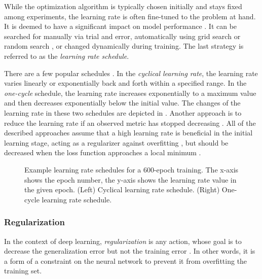While the optimization algorithm is typically chosen initially and stays fixed among experiments, the learning rate is often fine-tuned to the problem at hand. It is deemed to have a significant impact on model performance \cite{Goodfellow-et-al-2016,Bengio2012}. It can be searched for manually via trial and error, automatically using grid search or random search \cite{Goodfellow-et-al-2016}, or changed dynamically during training. The last strategy is referred to as the \emph{learning rate schedule}.

There are a few popular schedules \cite{Smith2018}. In the \emph{cyclical learning rate}, the learning rate varies linearly or exponentially back and forth within a specified range. In the \emph{one-cycle} schedule, the learning rate increases exponentially to a maximum value and then decreases exponentially below the initial value. The changes of the learning rate in these two schedules are depicted in . Another approach is to reduce the learning rate if an observed metric has stopped decreasing \cite{Pytorch}. All of the described approaches assume that a high learning rate is beneficial in the initial learning stage, acting as a regularizer against overfitting \cite{Smith2018}, but should be decreased when the loss function approaches a local minimum \cite{Goodfellow-et-al-2016}. 

\begin{figure}
  \centering
    
  \caption{Example learning rate schedules for a 600-epoch training. The x-axis shows the epoch number, the y-axis shows the learning rate value in the given epoch. (Left) Cyclical learning rate schedule. (Right) One-cycle learning rate schedule.}
  \label{fig:learning_rate_schedules}
\end{figure}

\subsubsection{Regularization}
\label{subsec:regularization}

In the context of deep learning, \emph{regularization} is any action, whose goal is to decrease the generalization error but not the training error \cite{Goodfellow-et-al-2016}. In other words, it is a form of a constraint on the neural network to prevent it from overfitting the training set.

